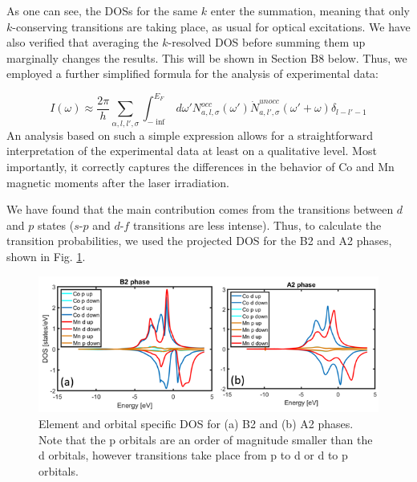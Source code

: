 As one can see, the DOSs for the same $k$ enter the summation, meaning that only $k$-conserving transitions are taking place, as usual for optical excitations. We have also verified that averaging the $k$-resolved DOS before summing them up marginally changes the results. This will be shown in Section B8 below. Thus, we employed a further simplified formula for the analysis of experimental data:

\begin{equation}
I(\omega)\approx\frac{2\pi}{h}\sum_{\alpha,l,l',\sigma}\int^{E_F}_{-\inf}d\omega'N^{occ}_{a,l,\sigma}(\omega')\dot N^{unocc}_{a,l',\sigma}(\omega'+\omega)\delta_{l-l'-1}
\label{eqn:HeuslerS5}
\end{equation}
An analysis based on such a simple expression allows for a straightforward interpretation of the experimental data at least on a qualitative level. Most importantly, it correctly captures the differences in the behavior of Co and Mn magnetic moments after the laser irradiation.

We have found that the main contribution comes from the transitions between $d$ and $p$ states ($s$-$p$ and $d$-$f$  transitions are less intense). Thus, to calculate the transition probabilities, we used the projected DOS for the B2 and A2 phases, shown in Fig. \ref{fig: elementOrbitalDOS}.

\begin{figure}[htbp]
	\begin{center}
		\includegraphics[width=150mm]{figs/ElementOrbitalDOS}
	\end{center}
	\caption{Element and orbital specific DOS for (a) B2 and (b) A2 phases. Note that the p orbitals are an order of magnitude smaller than the d orbitals, however transitions take place from p to d or d to p orbitals.}
	\label{fig: elementOrbitalDOS}
\end{figure}


